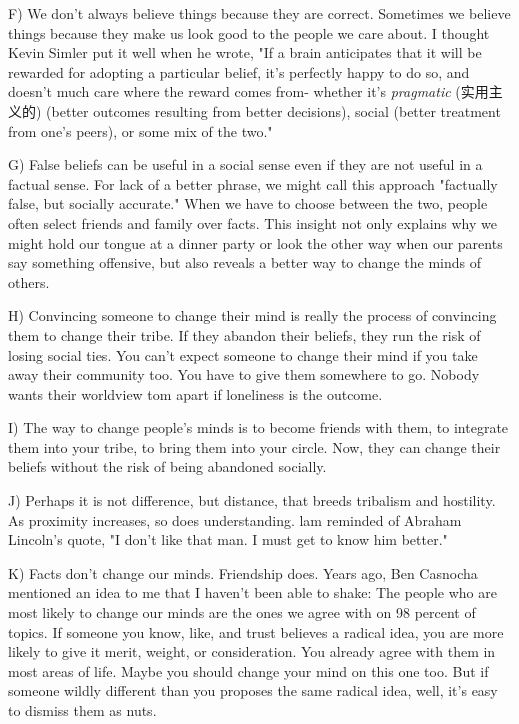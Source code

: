 \documentclass[UTF8,11pt]{ctexart}
\begin{document}
F) We don't always believe things because they are correct. Sometimes we believe things because they make us look good to the people we care about. I thought Kevin Simler put it well when he wrote, "If a brain anticipates that it will be rewarded for adopting a particular belief, it's perfectly happy to do so, and doesn't much care where the reward comes from- whether it's \textit{pragmatic }(实用主义的) (better outcomes resulting from better decisions), social (better treatment from one's peers), or some mix of the two."


G) False beliefs can be useful in a social sense even if they are not useful in a factual sense. For lack of a better phrase, we might call this approach "factually false, but socially accurate." When we have to choose between the two, people often select friends and family over facts. This insight not only explains why we might hold our tongue at a dinner party or look the other way when our parents say something offensive, but also reveals a better way to change the minds of others.


H) Convincing someone to change their mind is really the process of convincing them to change their tribe. If they abandon their beliefs, they run the risk of losing social ties. You can't expect someone to change their mind if you take away their community too. You have to give them somewhere to go. Nobody wants their worldview tom apart if loneliness is the outcome.


I) The way to change people's minds is to become friends with them, to integrate them into your tribe, to bring them into your circle. Now, they can change their beliefs without the risk of being abandoned socially.


J) Perhaps it is not difference, but distance, that breeds tribalism and hostility. As proximity increases, so does understanding. lam reminded of Abraham Lincoln's quote, "I don't like that man. I must get to know him better."


K) Facts don't change our minds. Friendship does. Years ago, Ben Casnocha mentioned an idea to me that I haven't been able to shake: The people who are most likely to change our minds are the ones we agree with on 98 percent of topics. If someone you know, like, and trust believes a radical idea, you are more likely to give it merit, weight, or consideration. You already agree with them in most areas of life. Maybe you should change your mind on this one too. But if someone wildly different than you proposes the same radical idea, well, it's easy to dismiss them as nuts.
\end{document}
